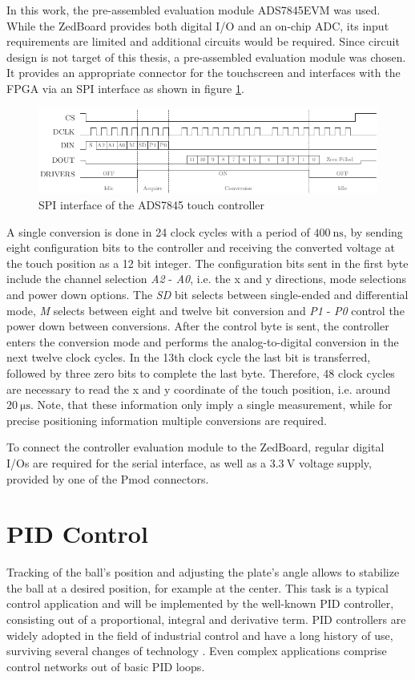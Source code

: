 In this work, the pre-assembled evaluation module ADS7845EVM \citep{ADS06} was
used. While the ZedBoard provides both digital I/O and an on-chip \ac{ADC},
its input requirements are limited and additional circuits would be required.
Since circuit design is not target of this thesis, a pre-assembled evaluation
module was chosen. It provides an appropriate connector for the touchscreen
and interfaces with the \ac{FPGA} via an \ac{SPI} interface as shown in figure
\ref{fig:touch_spi}.
\begin{figure}
	\centering
	\includegraphics{../figures/touch_spi}
	\caption{\acs{SPI} interface of the ADS7845 touch controller \citep[adapted from][]{ADST06}}
	\label{fig:touch_spi}
\end{figure}
A single conversion is done in 24 clock cycles with a period of
$\SI{400}{\nano\second}$, by sending eight configuration bits to the
controller and receiving the converted voltage at the touch position as a 12
bit integer. The configuration bits sent in the first byte include the channel
selection \emph{A2} - \emph{A0}, i.e. the x and y directions, mode selections
and power down options. The \emph{SD} bit selects between single-ended and
differential mode, \emph{M} selects between eight and twelve bit conversion
and \emph{P1} - \emph{P0} control the power down between conversions. After
the control byte is sent, the controller enters the conversion mode and
performs the analog-to-digital conversion in the next twelve clock cycles. In
the 13th clock cycle the last bit is transferred, followed by three zero bits
to complete the last byte. Therefore, 48 clock cycles are necessary to read
the x and y coordinate of the touch position, i.e. around
$\SI{20}{\micro\second}$. Note, that these information only imply a single
measurement, while for precise positioning information multiple conversions
are required.

To connect the controller evaluation module to the ZedBoard, regular digital
I/Os are required for the serial interface, as well as a $\SI{3.3}{\volt}$
voltage supply, provided by one of the \ac{Pmod} connectors.

\section{\acs{PID} Control}
Tracking of the ball's position and adjusting the plate's angle allows to
stabilize the ball at a desired position, for example at the center. This task
is a typical control application and will be implemented by the well-known
\ac{PID} controller, consisting out of a proportional, integral and derivative
term. \ac{PID} controllers are widely adopted in the field of industrial
control and have a long history of use, surviving several changes of
technology \citep{Joh05}. Even complex applications comprise control networks
out of basic \ac{PID} loops.

